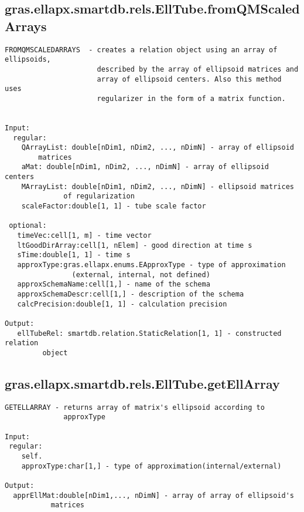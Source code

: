 \subsection{\texorpdfstring{gras.ellapx.smartdb.rels.EllTube.fromQMScaledArrays}{fromQMScaledArrays}}\label{method:gras.ellapx.smartdb.rels.EllTube.fromQMScaledArrays}
\begin{verbatim}
FROMQMSCALEDARRAYS  - creates a relation object using an array of ellipsoids,
                      described by the array of ellipsoid matrices and
                      array of ellipsoid centers. Also this method uses
                      regularizer in the form of a matrix function.


Input:
  regular:
    QArrayList: double[nDim1, nDim2, ..., nDimN] - array of ellipsoid
        matrices
    aMat: double[nDim1, nDim2, ..., nDimN] - array of ellipsoid centers
    MArrayList: double[nDim1, nDim2, ..., nDimN] - ellipsoid matrices
              of regularization
    scaleFactor:double[1, 1] - tube scale factor

 optional:
   timeVec:cell[1, m] - time vector
   ltGoodDirArray:cell[1, nElem] - good direction at time s
   sTime:double[1, 1] - time s
   approxType:gras.ellapx.enums.EApproxType - type of approximation
                (external, internal, not defined)
   approxSchemaName:cell[1,] - name of the schema
   approxSchemaDescr:cell[1,] - description of the schema
   calcPrecision:double[1, 1] - calculation precision

Output:
   ellTubeRel: smartdb.relation.StaticRelation[1, 1] - constructed relation
         object
\end{verbatim}
\subsection{\texorpdfstring{gras.ellapx.smartdb.rels.EllTube.getEllArray}{getEllArray}}\label{method:gras.ellapx.smartdb.rels.EllTube.getEllArray}
\begin{verbatim}
GETELLARRAY - returns array of matrix's ellipsoid according to
              approxType

Input:
 regular:
    self.
    approxType:char[1,] - type of approximation(internal/external)

Output:
  apprEllMat:double[nDim1,..., nDimN] - array of array of ellipsoid's
           matrices
\end{verbatim}
